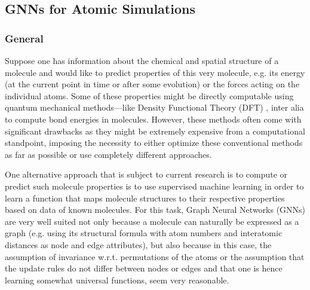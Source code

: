 \subsection{GNNs for Atomic Simulations}
\label{subsec:atomic-simulations}

\subsubsection{General}

Suppose one has information about the chemical and spatial structure of a molecule 
and would like to predict properties of this very molecule, e.g. its energy (at the 
current point in time or after some evolution) or the forces acting on the 
individual atoms. Some of these properties might be directly
computable using quantum mechanical methods---like Density Functional Theory (DFT) 
\cite{doi:10.1021/ed5004788}, inter alia
to compute bond energies in molecules. However, these methods often come
with significant drawbacks as they might be extremely expensive from a computational 
standpoint, imposing the necessity to either optimize these conventional methods 
as far as possible or use completely different approaches.

One alternative approach that is subject to current research is to compute or predict such molecule properties 
is to use supervised
machine learning in order to learn a function that maps molecule structures to their
respective properties based on data of known molecules. For this task, Graph
Neural Networks (GNNs) are very well suited not only because a molecule can naturally
be expressed as a graph (e.g. using its structural formula with atom numbers and
interatomic distances as node and edge attributes), but also because in this case, the 
assumption of invariance w.r.t. permutations of the atoms or the assumption that 
the update rules do not differ between nodes or edges and that one is hence
learning somewhat universal functions, seem very reasonable.

